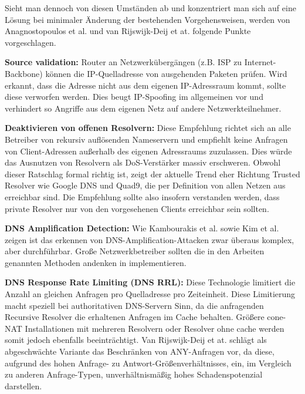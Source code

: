 Sieht man dennoch von diesen Umständen ab und konzentriert man sich auf eine Lösung bei minimaler Änderung der bestehenden Vorgehensweisen, werden von Anagnostopoulos et al.\cite{Anagnostopoulos2013} und van Rijswijk-Deij et at.\cite{VanRijswijk-Deij2014} folgende Punkte vorgeschlagen.

\textbf{Source validation:} Router an Netzwerkübergängen (z.B. ISP zu Internet-Backbone) können die IP-Quelladresse von ausgehenden Paketen prüfen. Wird erkannt, dass die Adresse nicht aus dem eigenen IP-Adressraum kommt, sollte diese verworfen werden. Dies beugt IP-Spoofing im allgemeinen vor und verhindert so Angriffe aus dem eigenen Netz auf andere Netzwerkteilnehmer.

\textbf{Deaktivieren von offenen Resolvern:} Diese Empfehlung richtet sich an alle Betreiber von rekursiv auflösenden Nameservern und empfiehlt keine Anfragen von Client-Adressen außerhalb des eigenen Adressraums zuzulassen. Dies würde das Ausnutzen von Resolvern als DoS-Verstärker massiv erschweren. Obwohl dieser Ratschlag formal richtig ist, zeigt der aktuelle Trend eher Richtung Trusted Resolver wie Google DNS und Quad9, die per Definition von allen Netzen aus erreichbar sind. Die Empfehlung sollte also insofern verstanden werden, dass private Resolver nur von den vorgesehenen Clients erreichbar sein sollten.

\textbf{DNS Amplification Detection:} Wie Kambourakis et al.\cite{Kambourakis2008} sowie Kim et al.\cite{Kim2011} zeigen ist das erkennen von DNS-Amplification-Attacken zwar überaus komplex, aber durchführbar. Große Netzwerkbetreiber sollten die in den Arbeiten genannten Methoden andenken in implementieren.

\textbf{DNS Response Rate Limiting (DNS RRL):} Diese Technologie limitiert die Anzahl an gleichen Anfragen pro Quelladresse pro Zeiteinheit. Diese Limitierung macht speziell bei authoritativen DNS-Servern Sinn, da die anfragenden Recursive Resolver die erhaltenen Anfragen im Cache behalten. Größere cone-NAT Installationen mit mehreren Resolvern oder Resolver ohne cache werden somit jedoch ebenfalls beeinträchtigt. Van Rijswijk-Deij et at.\cite{VanRijswijk-Deij2014} schlägt als abgeschwächte Variante das Beschränken von ANY-Anfragen vor, da diese, aufgrund des hohen Anfrage- zu Antwort-Größenverhältnisses, ein, im Vergleich zu anderen Anfrage-Typen, unverhältnismäßig hohes Schadenspotenzial darstellen.